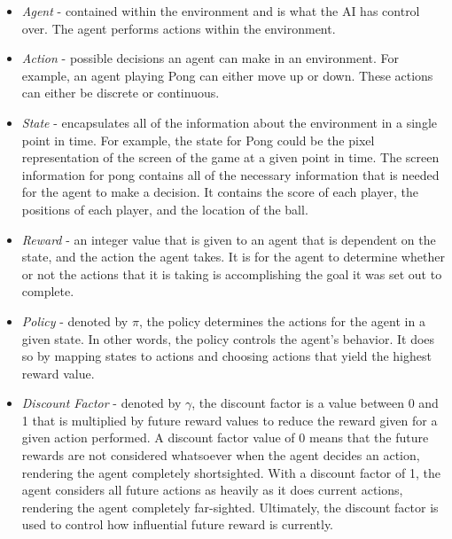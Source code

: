 \documentclass[12pt]{article}
\begin{document}
 \renewcommand{\labelitemi}{}
\begin{itemize}

    \item \textit{Agent} - contained within the environment and is what the AI has control over.  The agent performs actions within the environment.
    
    \item \textit{Action} - possible decisions an agent can make in an environment.  For example, an agent playing Pong can either move up or down.  These actions can either be discrete or continuous.
    
    \item \textit{State} - encapsulates all of the information about the environment in a single point in time.  For example, the state for Pong could be the pixel representation of the screen of the game at a given point in time. The screen information for pong contains all of the necessary information that is needed for the agent to make a decision.  It contains the score of each player, the positions of each player, and the location of the ball.
    
    \item \textit{Reward} - an integer value that is given to an agent that is dependent on the state, and the action the agent takes.  It is for the agent to determine whether or not the actions that it is taking is accomplishing the goal it was set out to complete.
    
    \item \textit{Policy} - denoted by $\pi$, the policy determines the actions for the agent in a given state.  In other words, the policy controls the agent’s behavior. It does so by mapping states to actions and choosing actions that yield the highest reward value.
    
    \item \textit{Discount Factor} - denoted by $\gamma$, the discount factor is a value between 0 and 1 that is multiplied by future reward values to reduce the reward given for a given action performed. A discount factor value of 0 means that the future rewards are not considered whatsoever when the agent decides an action, rendering the agent completely shortsighted.  With a discount factor of 1, the agent considers all future actions as heavily as it does current actions, rendering the agent completely far-sighted.  Ultimately, the discount factor is used to control how influential future reward is currently.
    

\end{itemize}
\end{document}
